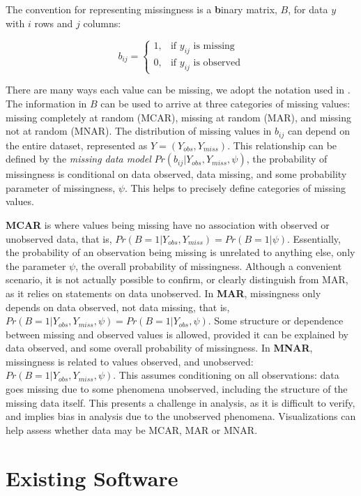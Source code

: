 \documentclass[
]{jss}
\begin{document}
The convention for representing missingness is a \textbf{b}inary matrix, \(B\), for data \(y\) with \(i\) rows and \(j\) columns:

\[
b_{ij} =\begin{cases}
1, & \text{if } y_{ij} \text{ is missing} \\
0, & \text{if } y_{ij} \text{ is observed}
\end{cases}
\]

There are many ways each value can be missing, we adopt the notation used in \citep{vanBuuren2018}. The information in \(B\) can be used to arrive at three categories of missing values: missing completely at random (MCAR), missing at random (MAR), and missing not at random (MNAR). The distribution of missing values in \(b_{ij}\) can depend on the entire dataset, represented as \(Y = (Y_{obs}, Y_{miss})\). This relationship can be defined by the \emph{missing data model} \(Pr(b_{ij} | Y_{obs}, Y_{miss}, \psi)\), the probability of missingness is conditional on data observed, data missing, and some probability parameter of missingness, \(\psi\). This helps to precisely define categories of missing values.

\textbf{MCAR} is where values being missing have no association with observed or unobserved data, that is, \(Pr(B = 1 | Y_{obs}, Y_{miss}) = Pr(B = 1 | \psi)\). Essentially, the probability of an observation being missing is unrelated to anything else, only the parameter \(\psi\), the overall probability of missingness. Although a convenient scenario, it is not actually possible to confirm, or clearly distinguish from MAR, as it relies on statements on data unobserved. In \textbf{MAR}, missingness only depends on data observed, not data missing, that is, \(Pr(B = 1 | Y_{obs}, Y_{miss}, \psi) = Pr(B = 1 | Y_{obs}, \psi)\). Some structure or dependence between missing and observed values is allowed, provided it can be explained by data observed, and some overall probability of missingness. In \textbf{MNAR}, missingness is related to values observed, and unobserved: \(Pr(B = 1 | Y_{obs}, Y_{miss}, \psi)\). This assumes conditioning on all observations: data goes missing due to some phenomena unobserved, including the structure of the missing data itself. This presents a challenge in analysis, as it is difficult to verify, and implies bias in analysis due to the unobserved phenomena. Visualizations can help assess whether data may be MCAR, MAR or MNAR.

\hypertarget{existing-software}{%
\section{Existing Software}\label{existing-software}}
\end{document}
